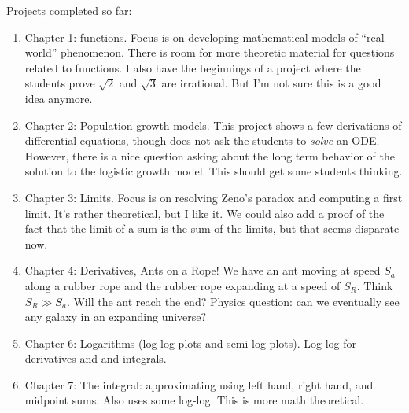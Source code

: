 \documentclass[12pt]{article}
\theoremstyle{definition}
\begin{document}
\noindent Projects completed so far:
\begin{enumerate}
\item Chapter 1: functions.  Focus is on developing mathematical models of ``real world'' phenomenon.  There is room for more theoretic material for questions related to functions.  I also have the beginnings of a project where the students prove $\sqrt{2}$ and $\sqrt{3}$ are irrational.  But I'm not sure this is a good idea anymore.

	\item Chapter 2: Population growth models.  This project shows a few derivations of differential equations, though does not ask the students to \textit{solve} an ODE.  However, there is a nice question asking about the long term behavior of the solution to the logistic growth model.  This should get some students thinking.
	
	\item Chapter 3: Limits. Focus is on resolving Zeno's paradox and computing a first limit.  It's rather theoretical, but I like it.  We could also add a proof of the fact that the limit of a sum is the sum of the limits, but that seems disparate now.
	
	\item Chapter 4: Derivatives, Ants on a Rope!  We have an ant moving at speed $S_a$ along a rubber rope and the rubber rope expanding at a speed of $S_R$.  Think $S_R \gg S_a$.  Will the ant reach the end?  Physics question: can we eventually see any galaxy in an expanding universe?
	

	
	\item Chapter 6: Logarithms (log-log plots and semi-log plots).  Log-log for derivatives and and integrals.
	
	\item Chapter 7: The integral: approximating using left hand, right hand, and midpoint sums. Also uses some log-log.  This is more math theoretical.

\end{enumerate}
\end{document}
